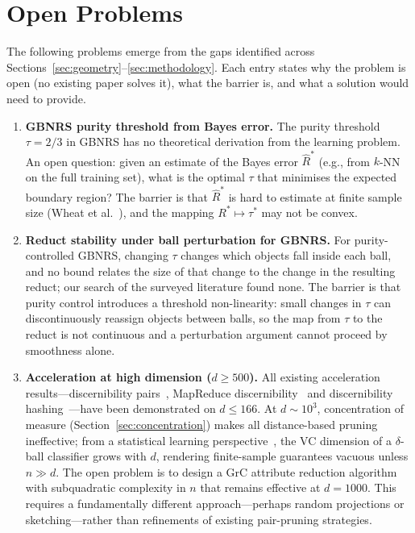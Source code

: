 \section{Open Problems}
\label{sec:open}

The following problems emerge from the gaps identified across
Sections~\ref{sec:geometry}--\ref{sec:methodology}.  Each entry states
why the problem is open (no existing paper solves it), what the barrier is,
and what a solution would need to provide.

\begin{enumerate}

\item \textbf{GBNRS purity threshold from Bayes error.}
The purity threshold $\tau = 2/3$ in GBNRS has no theoretical derivation
from the learning problem.  An open question: given an estimate of the
Bayes error $\hat{R}^*$ (e.g., from $k$-NN on the full training set), what
is the optimal $\tau$ that minimises the expected boundary region?
The barrier is that $\hat{R}^*$ is hard to estimate at finite sample size
(Wheat et al.~\cite{Wheat2025BER}), and the mapping $R^* \mapsto \tau^*$
may not be convex.

\item \textbf{Reduct stability under ball perturbation for GBNRS.}
For purity-controlled GBNRS, changing $\tau$ changes which objects fall
inside each ball, and no bound relates the size of that change to the change
in the resulting reduct; our search of the surveyed literature found none.
The barrier is that purity control introduces a threshold non-linearity:
small changes in $\tau$ can discontinuously reassign objects between balls,
so the map from $\tau$ to the reduct is not continuous and a perturbation
argument cannot proceed by smoothness alone.

\item \textbf{Acceleration at high dimension ($d \geq 500$).}
All existing acceleration results---discernibility pairs~\cite{Dai2018TFS},
MapReduce discernibility~\cite{Sowkuntla2021DARA} and discernibility
hashing~\cite{Luo2025hash}---have been demonstrated on $d \leq 166$.  At $d \sim 10^3$, concentration of measure (Section~\ref{sec:concentration})
makes all distance-based pruning ineffective; from a statistical learning
perspective~\cite{Vapnik1999TNN}, the VC dimension of a $\delta$-ball classifier
grows with $d$, rendering finite-sample guarantees vacuous unless $n \gg d$.
The open problem is to design
a GrC attribute reduction algorithm with subquadratic complexity in $n$ that
remains effective at $d = 1000$.  This requires a fundamentally different
approach---perhaps random projections or sketching---rather than refinements
of existing pair-pruning strategies.


\end{enumerate}
